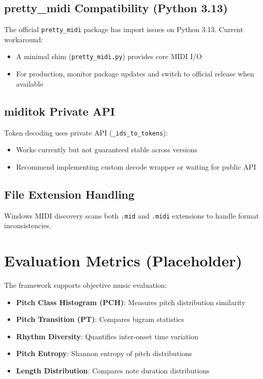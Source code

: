 \subsection{pretty\_midi Compatibility (Python 3.13)}
The official \texttt{pretty\_midi} package has import issues on Python 3.13. Current workaround:
\begin{itemize}
    \item A minimal shim (\texttt{pretty\_midi.py}) provides core MIDI I/O
    \item For production, monitor package updates and switch to official release when available
\end{itemize}

\subsection{miditok Private API}
Token decoding uses private API (\texttt{\_ids\_to\_tokens}):
\begin{itemize}
    \item Works currently but not guaranteed stable across versions
    \item Recommend implementing custom decode wrapper or waiting for public API
\end{itemize}

\subsection{File Extension Handling}
Windows MIDI discovery scans both \texttt{.mid} and \texttt{.midi} extensions to handle format inconsistencies.

\section{Evaluation Metrics (Placeholder)}

The framework supports objective music evaluation:

\begin{itemize}
    \item \textbf{Pitch Class Histogram (PCH)}: Measures pitch distribution similarity
    \item \textbf{Pitch Transition (PT)}: Compares bigram statistics
    \item \textbf{Rhythm Diversity}: Quantifies inter-onset time variation
    \item \textbf{Pitch Entropy}: Shannon entropy of pitch distributions
    \item \textbf{Length Distribution}: Compares note duration distributions
\end{itemize}

